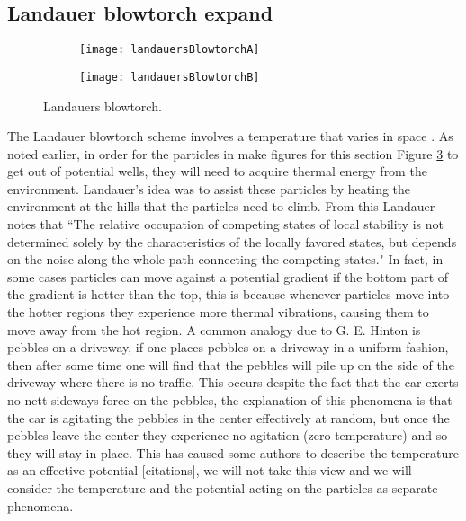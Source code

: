 \subsection{Landauer blowtorch {\color{red} expand}}
\begin{figure}[tb]
	\begin{subfigure}{0.49\textwidth}
		\texttt{[image: landauersBlowtorchA]}
		\caption{\label{fig:landauerA}}
	\end{subfigure}
\begin{subfigure}{0.49\textwidth}
		\texttt{[image: landauersBlowtorchB]}
		\caption{\label{fig:landauerB}}
\end{subfigure}
\caption{Landauers blowtorch.}
\label{fig:Schematic}
\end{figure}
The Landauer blowtorch scheme involves a temperature that varies in space \cite{Landauer1988}. As noted earlier, in order for the particles in {\color{red} make figures for this section} Figure \ref{fig:Schematic} to get out of potential wells, they will need to acquire thermal energy from the environment. Landauer's idea was to assist these particles by heating the environment at the hills that the particles need to climb. From this Landauer notes that \cite{Landauer1988} ``The relative occupation of competing states of local stability is not determined solely by the characteristics of the locally favored states, but depends on the noise along the whole path connecting the competing states." In fact, in some cases particles can move against a potential gradient if the bottom part of the gradient is hotter than the top, this is because whenever particles move into the hotter regions they experience more thermal vibrations, causing them to move away from the hot region. A common analogy due to G. E. Hinton is pebbles on a driveway, if one places pebbles on a driveway in a uniform fashion, then after some time one will find that the pebbles will pile up on the side of the driveway where there is no traffic. This occurs despite the fact that the car exerts no nett sideways force on the pebbles, the explanation of this phenomena is that the car is agitating the pebbles in the center effectively at random, but once the pebbles leave the center they experience no agitation (zero temperature) and so they will stay in place. This has caused some authors to describe the temperature as an effective potential [citations], we will not take this view and we will consider the temperature and the potential acting on the particles as separate phenomena.


